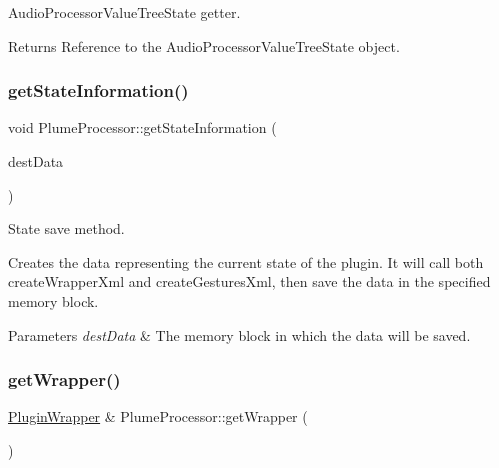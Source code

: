 Audio\+Processor\+Value\+Tree\+State getter. 

\begin{DoxyReturn}{Returns}
Reference to the Audio\+Processor\+Value\+Tree\+State object. 
\end{DoxyReturn}
\mbox{\label{class_plume_processor_ae06dd312c3dc3ba7389ce44fd74cbc18}} 
\subsubsection{\texorpdfstring{get\+State\+Information()}{getStateInformation()}}
{\footnotesize\ttfamily void Plume\+Processor\+::get\+State\+Information (\begin{DoxyParamCaption}\item[{Memory\+Block \&}]{dest\+Data }\end{DoxyParamCaption})\hspace{0.3cm}{\ttfamily [override]}}



State save method. 

Creates the data representing the current state of the plugin. It will call both create\+Wrapper\+Xml and create\+Gestures\+Xml, then save the data in the specified memory block.


\begin{DoxyParams}{Parameters}
{\em dest\+Data} & The memory block in which the data will be saved. \\
\hline
\end{DoxyParams}
\mbox{\label{class_plume_processor_a6ec4d89f181beea78034b81911c59aa8}} 
\subsubsection{\texorpdfstring{get\+Wrapper()}{getWrapper()}}
{\footnotesize\ttfamily \mbox{\hyperlink{class_plugin_wrapper}{Plugin\+Wrapper}} \& Plume\+Processor\+::get\+Wrapper (\begin{DoxyParamCaption}{ }\end{DoxyParamCaption})}



